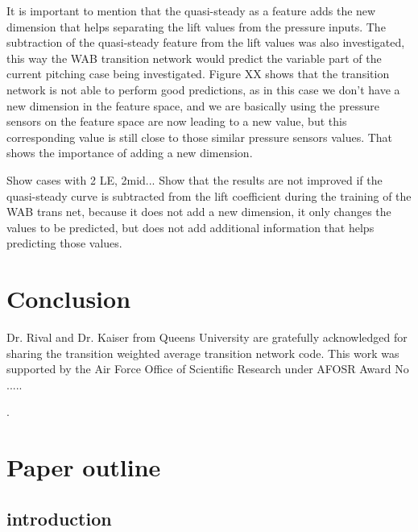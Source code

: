 \documentclass[%
 reprint,
 amsmath,amssymb,
 aps,
]{revtex4-2}
\begin{document}
It is important to mention that the quasi-steady as a feature adds the new dimension that helps separating the lift values from the pressure inputs. 
The subtraction of the quasi-steady feature from the lift values was also investigated, this way the WAB transition network would predict the variable part of the current pitching case being investigated. 
Figure XX shows that the transition network is not able to perform good predictions, as in this case we don't have a new dimension in the feature space, and we are basically using the pressure sensors on the feature space are now leading to a new value, but this corresponding value is still close to those similar pressure sensors values. 
That shows the importance of adding a new dimension.

Show cases with 2 LE, 2mid...
Show that the results are not improved if the quasi-steady curve is subtracted from the lift coefficient during the training of the WAB trans net, because it does not add a new dimension, it only changes the values to be predicted, but does not add additional information that helps predicting those values.

\section{Conclusion}

\begin{acknowledgments}
Dr. Rival and Dr. Kaiser from Queens University are gratefully acknowledged for sharing the transition weighted average transition network code. This work was supported by 
the Air Force Office of Scientific Research under AFOSR Award No .....
\end{acknowledgments}

\appendix
\pagebreak
\newpage
.
\newpage
\section{Paper outline}

\subsection{introduction}
\end{document}

